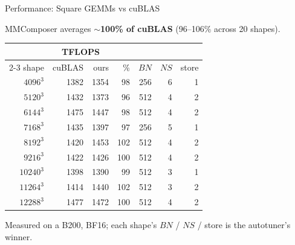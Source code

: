 \documentclass[aspectratio=169,professionalfonts]{beamer}
\begin{document}
\begin{frame}{Performance: Square GEMMs vs cuBLAS}
  \begin{center}\small
    MMComposer averages \textbf{$\sim$100\% of cuBLAS} (96--106\% across 20
    shapes).
  \end{center}

  \vspace{0.1cm}
  \begin{center}\small
    \setlength{\tabcolsep}{6pt}
    \begin{tabular}{rrrrrrr}
      \toprule
      & \multicolumn{2}{c}{TFLOPS} & & & & \\
      \cmidrule(lr){2-3}
      shape & cuBLAS & ours & \% & $BN$ & $NS$ & store \\
      \midrule
      $4096^3$  & 1382 & 1354 &  98 & 256 & 6 & 1 \\
      $5120^3$  & 1432 & 1373 &  96 & 512 & 4 & 2 \\
      $6144^3$  & 1475 & 1447 &  98 & 512 & 4 & 2 \\
      $7168^3$  & 1435 & 1397 &  97 & 256 & 5 & 1 \\
      $8192^3$  & 1420 & 1453 & 102 & 512 & 4 & 2 \\
      $9216^3$  & 1422 & 1426 & 100 & 512 & 4 & 2 \\
      $10240^3$ & 1398 & 1390 &  99 & 512 & 3 & 1 \\
      $11264^3$ & 1414 & 1440 & 102 & 512 & 3 & 2 \\
      $12288^3$ & 1477 & 1472 & 100 & 512 & 4 & 2 \\
      \bottomrule
    \end{tabular}
  \end{center}

  \vspace{0.15cm}
  {\footnotesize Measured on a B200, BF16; each shape's $BN$ / $NS$ / store is the
  autotuner's winner.}
\end{frame}
\end{document}

